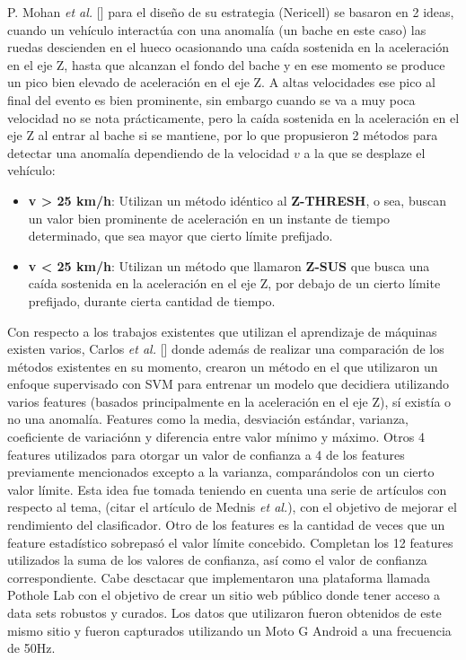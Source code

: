 P. Mohan {\it et al.} [] para el diseño de su estrategia (Nericell) se basaron en 2 ideas, cuando un vehículo interactúa con una
anomalía (un bache en este caso) las ruedas descienden en el hueco ocasionando una caída sostenida en la aceleración en el eje Z,
hasta que alcanzan el fondo del bache y en ese momento se produce un pico bien elevado de aceleración en el eje Z. A altas velocidades
ese pico al final del evento es bien prominente, sin embargo cuando se va a muy poca velocidad no se nota prácticamente, pero la caída
sostenida en la aceleración en el eje Z al entrar al bache si se mantiene, por lo que propusieron 2 métodos para detectar una anomalía
dependiendo de la velocidad $v$ a la que se desplaze el vehículo:\\

\begin{itemize}
	\item  \textbf {v > 25 km/h}:  Utilizan un método idéntico al \textbf {Z-THRESH}, o sea, buscan un valor bien prominente de
		aceleración en un instante de tiempo determinado, que sea mayor que cierto límite prefijado.\\
	\item \textbf {v < 25 km/h}:  Utilizan un método que llamaron \textbf {Z-SUS} que busca una caída sostenida en la aceleración
		en el eje Z, por debajo de un cierto límite prefijado, durante cierta cantidad de tiempo.\\
\end{itemize}

Con respecto a los trabajos existentes que utilizan el aprendizaje de máquinas existen varios, Carlos {\it et al.} [] donde además de realizar 
una comparación de los métodos existentes en su momento, crearon un método en el que utilizaron un enfoque supervisado con SVM para entrenar 
un modelo que decidiera utilizando varios features (basados principalmente en la aceleración en el eje Z), sí existía o no una anomalía. Features
como la media, desviación estándar, varianza, coeficiente de variaciónn y diferencia entre valor mínimo y máximo. Otros 4 features utilizados para
otorgar un valor de confianza a 4 de los features previamente mencionados excepto a la varianza, comparándolos con un cierto valor límite. Esta idea
fue tomada teniendo en cuenta una serie de artículos con respecto al tema, (citar el artículo de Mednis {\it et al.}), con el objetivo de mejorar el rendimiento
del clasificador. Otro de los features es la cantidad de veces que un feature estadístico sobrepasó el valor límite concebido. Completan los 12 features
utilizados la suma de los valores de confianza, así como el valor de confianza correspondiente. Cabe desctacar que implementaron una plataforma llamada 
Pothole Lab con el objetivo de crear un sitio web público donde tener acceso a data sets robustos y curados. Los datos que utilizaron fueron obtenidos de este
mismo sitio y fueron capturados utilizando un Moto G Android a una frecuencia de 50Hz.\\

